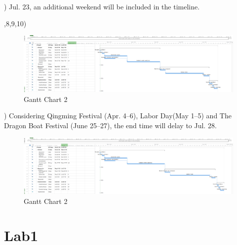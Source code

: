 \documentclass[runningheads]{llncs}
\begin{document}
) Jul. 23, an additional weekend will be included in the timeline.

,8,9,10) 
\begin{figure}[H]
    \centering
    \includegraphics[width=1.0\textwidth]{./image/proj2}
    \caption{Gantt Chart 2}
\end{figure}

) Considering Qingming Festival (Apr. 4–6), Labor Day(May 1–5) and The Dragon Boat Festival (June 25–27), the end time will delay to Jul. 28.
\begin{figure}[H]
    \centering
    \includegraphics[width=1.0\textwidth]{./image/proj3}
    \caption{Gantt Chart 2}
\end{figure}


\section{Lab1}
\subsection{}
\end{document}
